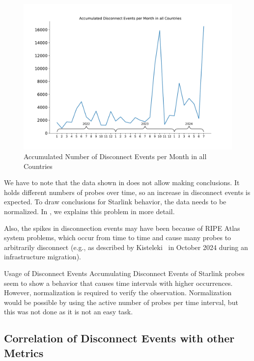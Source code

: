 \begin{figure}
	\centering
	\includegraphics[width=.7\linewidth]{./chapters/4-results/disconnect_events/accumulated_disconnect_events_per_month_in_all_countries.pdf}
	\caption{Accumulated Number of Disconnect Events per Month in all
		Countries}
	\label{fig:disconnect-events-absolute-all-countries}
\end{figure}

We have to note that the data shown in
 does not allow making
conclusions. It holds different numbers of probes over time, so an increase in
disconnect events is expected. To draw conclusions for Starlink behavior, the
data needs to be normalized. In , we
explains this problem in more detail.

Also, the spikes in disconnection events may have been because of RIPE Atlas
system problems, which occur from time to time and cause many probes to
arbitrarily disconnect (e.g., as described by Kisteleki~\cite{Kisteleki2024} in
October 2024 during an infrastructure migration).

\begin{takeaway}{Usage of Disconnect Events}
	Accumulating Disconnect Events of Starlink probes seem to show a
	behavior that causes time intervals with higher occurrences. However,
	normalization is required to verify the observation. Normalization
	would be possible by using the active number of probes per time
	interval, but this was not done as it is not an easy task.
\end{takeaway}

\subsection*{Correlation of Disconnect Events with other Metrics}
\label{sec:correlation-disconnect-events}

